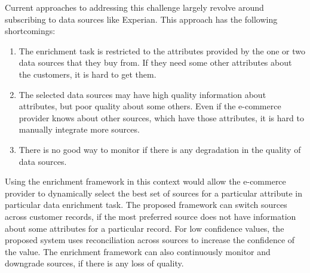 		Current approaches to addressing this challenge largely revolve around subscribing to data sources like Experian. This approach has the following shortcomings:
		\begin{enumerate}
			\item The enrichment task is restricted to the attributes provided by the one or two data sources that they buy from. If they need some other attributes about the customers, it is hard to get them.
			\item The selected data sources may have high quality information about attributes, but poor quality about some others. Even if the e-commerce provider knows about other sources, which have those
				attributes, it is hard to manually integrate more sources.
			\item There is no good way to monitor if there is any degradation in the quality of data sources.
		\end{enumerate}
Using the enrichment framework in this context would allow the e-commerce provider to dynamically select the best set of sources for a particular attribute in  particular data enrichment task. 
The proposed framework can switch sources across customer records, if the most preferred source does not have information about some attributes for a particular record. For low confidence values, the 
proposed system uses reconciliation across sources to increase the confidence of the value. The enrichment framework can also continuously monitor and downgrade sources, if there is any loss of quality.

